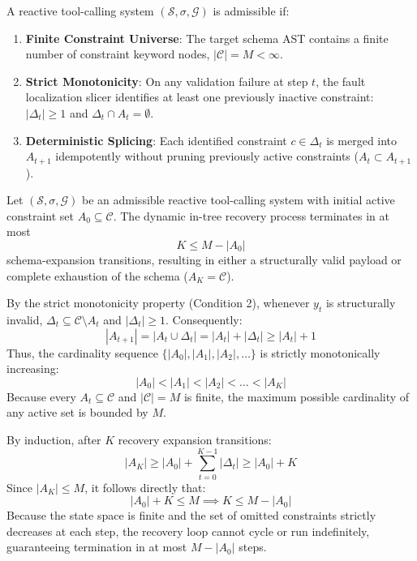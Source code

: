\begin{definition}
A reactive tool-calling system $(\mathcal{S}, \sigma, \mathcal{G})$ is admissible if:
\begin{enumerate}
    \item \textbf{Finite Constraint Universe}: The target schema AST contains a finite number of constraint keyword nodes, $|\mathcal{C}| = M < \infty$.
    \item \textbf{Strict Monotonicity}: On any validation failure at step $t$, the fault localization slicer identifies at least one previously inactive constraint: $|\Delta_t| \ge 1$ and $\Delta_t \cap A_t = \emptyset$.
    \item \textbf{Deterministic Splicing}: Each identified constraint $c \in \Delta_t$ is merged into $A_{t+1}$ idempotently without pruning previously active constraints ($A_t \subset A_{t+1}$).
\end{enumerate}
\end{definition}

\begin{theorem}
\label{thm:termination}
Let $(\mathcal{S}, \sigma, \mathcal{G})$ be an admissible reactive tool-calling system with initial active constraint set $A_0 \subseteq \mathcal{C}$. The dynamic in-tree recovery process terminates in at most
\begin{equation}
\boxed{K \le M - |A_0|}
\end{equation}
schema-expansion transitions, resulting in either a structurally valid payload or complete exhaustion of the schema ($A_K = \mathcal{C}$).
\end{theorem}

\begin{IEEEproof}
By the strict monotonicity property (Condition 2), whenever $y_t$ is structurally invalid, $\Delta_t \subseteq \mathcal{C} \setminus A_t$ and $|\Delta_t| \ge 1$. Consequently:
\begin{equation}
|A_{t+1}| = |A_t \cup \Delta_t| = |A_t| + |\Delta_t| \ge |A_t| + 1
\end{equation}
Thus, the cardinality sequence $\{|A_0|, |A_1|, |A_2|, \dots\}$ is strictly monotonically increasing:
\begin{equation}
|A_0| < |A_1| < |A_2| < \dots < |A_K|
\end{equation}
Because every $A_t \subseteq \mathcal{C}$ and $|\mathcal{C}| = M$ is finite, the maximum possible cardinality of any active set is bounded by $M$.

By induction, after $K$ recovery expansion transitions:
\begin{equation}
|A_K| \ge |A_0| + \sum_{t=0}^{K-1} |\Delta_t| \ge |A_0| + K
\end{equation}
Since $|A_K| \le M$, it follows directly that:
\begin{equation}
|A_0| + K \le M \implies K \le M - |A_0|
\end{equation}
Because the state space is finite and the set of omitted constraints strictly decreases at each step, the recovery loop cannot cycle or run indefinitely, guaranteeing termination in at most $M - |A_0|$ steps.
\end{IEEEproof}

